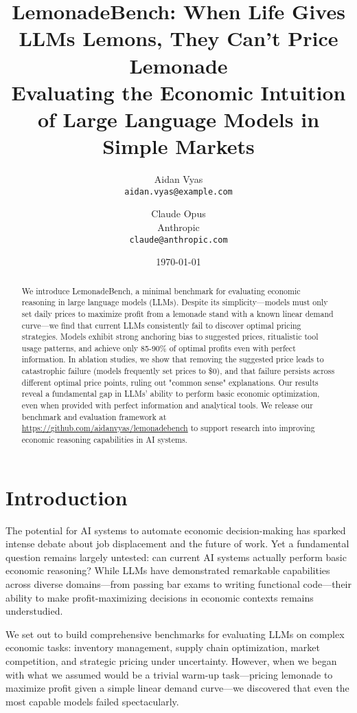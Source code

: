 \documentclass[11pt]{article}
\title{LemonadeBench: When Life Gives LLMs Lemons, They Can't Price Lemonade\\
\large Evaluating the Economic Intuition of Large Language Models in Simple Markets}
\author{
    Aidan Vyas\\
    \texttt{aidan.vyas@example.com}
    \and
    Claude Opus\\
    Anthropic\\
    \texttt{claude@anthropic.com}
}
\date{\today}
\begin{document}
\maketitle

\begin{abstract}
We introduce LemonadeBench, a minimal benchmark for evaluating economic reasoning in large language models (LLMs). 
Despite its simplicity—models must only set daily prices to maximize profit from a lemonade stand with a known linear demand curve—we find that current LLMs consistently fail to discover optimal pricing strategies. 
Models exhibit strong anchoring bias to suggested prices, ritualistic tool usage patterns, and achieve only 85-90\% of optimal profits even with perfect information.
In ablation studies, we show that removing the suggested price leads to catastrophic failure (models frequently set prices to \$0), and that failure persists across different optimal price points, ruling out "common sense" explanations.
Our results reveal a fundamental gap in LLMs' ability to perform basic economic optimization, even when provided with perfect information and analytical tools.
We release our benchmark and evaluation framework at \url{https://github.com/aidanvyas/lemonadebench} to support research into improving economic reasoning capabilities in AI systems.
\end{abstract}

\section{Introduction}

The potential for AI systems to automate economic decision-making has sparked intense debate about job displacement and the future of work. 
Yet a fundamental question remains largely untested: can current AI systems actually perform basic economic reasoning?
While LLMs have demonstrated remarkable capabilities across diverse domains—from passing bar exams to writing functional code—their ability to make profit-maximizing decisions in economic contexts remains understudied.

We set out to build comprehensive benchmarks for evaluating LLMs on complex economic tasks: inventory management, supply chain optimization, market competition, and strategic pricing under uncertainty.
However, when we began with what we assumed would be a trivial warm-up task—pricing lemonade to maximize profit given a simple linear demand curve—we discovered that even the most capable models failed spectacularly.
\end{document}
